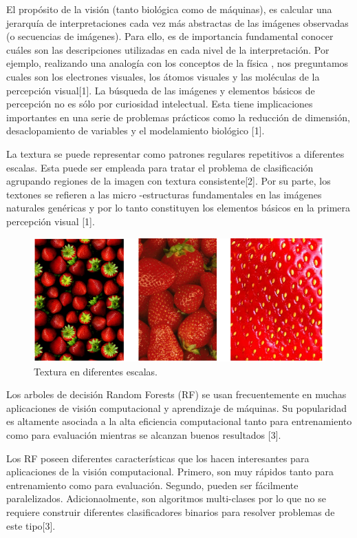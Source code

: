 \documentclass[10pt,twocolumn,letterpaper]{article}
\begin{document}
El propósito de la visión (tanto biológica como de máquinas), es calcular una jerarquía de interpretaciones cada vez más abstractas de las imágenes observadas (o secuencias de imágenes). Para ello, es de importancia fundamental conocer cuáles son las descripciones utilizadas en cada nivel de la interpretación. Por ejemplo, realizando una analogía con los conceptos de la física , nos preguntamos cuales son los electrones visuales, los átomos visuales y las moléculas de la percepción visual[1].
La búsqueda de las imágenes y elementos básicos de percepción no es sólo por curiosidad intelectual. Esta tiene implicaciones importantes en una serie de problemas prácticos como la reducción de dimensión, desaclopamiento de variables y el modelamiento biológico [1].

La textura se puede representar como patrones regulares repetitivos a diferentes escalas. Esta puede ser empleada para tratar el problema de clasificación agrupando regiones de la imagen con textura consistente[2]. Por su parte, los textones se refieren a las micro -estructuras fundamentales en las imágenes naturales genéricas y por lo tanto constituyen los elementos básicos en la primera percepción visual [1].

\begin{figure}[t]
\begin{center}
   \includegraphics[width=1\linewidth]{text_esca.png}
\end{center}
   \caption{Textura en diferentes escalas.}
\label{fig:seg}
\end{figure}

Los arboles de decisión Random Forests (RF) se usan frecuentemente en muchas aplicaciones de visión computacional y aprendizaje de máquinas. Su popularidad es altamente asociada a la alta eficiencia computacional tanto para entrenamiento como para evaluación mientras se alcanzan buenos resultados [3].

Los RF poseen diferentes características que los hacen interesantes para aplicaciones de la visión computacional. Primero, son muy rápidos tanto para entrenamiento como para evaluación. Segundo, pueden ser fácilmente paralelizados. Adicionaolmente, son algoritmos multi-clases por lo que no se requiere construir diferentes clasificadores binarios para resolver problemas de este tipo[3].
\end{document}
